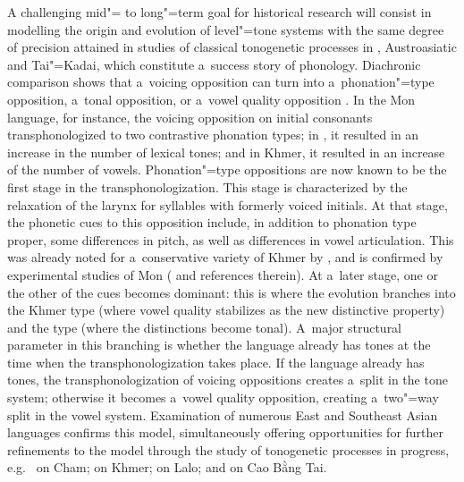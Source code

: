 A challenging mid"= to long"=term goal for historical research will consist in modelling the origin and evolution of level"=tone systems with the same degree of precision attained in studies of classical tonogenetic processes in , Austroasiatic and Tai"=Kadai, which constitute a~success story of  phonology. Diachronic comparison shows that a~voicing opposition can turn into a~phonation"=type opposition, a~tonal opposition, or a~vowel quality opposition \citep{haudricourt1965a,ferlus1979}. In the Mon language, for instance, the voicing opposition on initial consonants transphonologized to two contrastive phonation types; 
in , it resulted in an increase in the number of lexical tones; and in Khmer, it resulted in an increase of the number of vowels. Phonation"=type oppositions are now known to be the first stage in the transphonologization. This stage is characterized by the relaxation of the larynx for syllables with formerly voiced initials. At that stage, the phonetic cues to this opposition include, in addition to phonation type proper, some differences in pitch, as well as differences in vowel articulation. This was already noted for a~{conservative} variety of Khmer by \citet{henderson1952}, and is confirmed by experimental studies of Mon (\citealt{abramsonetal2015} and references therein). At a~later stage, one or the other of the cues becomes dominant: this is where the evolution branches into the Khmer type (where vowel quality stabilizes as the new distinctive property) and the  type (where the distinctions become tonal). A~major structural parameter in this branching is whether the language already has tones at the time when the transphonologization takes place. If the language already has tones, the transphonologization of voicing
oppositions creates a~split in the tone system; otherwise it becomes a~vowel quality opposition, creating a~two"=way split in the vowel system. Examination of numerous East and Southeast Asian languages confirms this model, simultaneously offering opportunities for further refinements to the model through the study of tonogenetic processes in progress, e.g.~\citet{brunelle2012} on Cham; \citet{kirby2014} on Khmer; \citet{yangetal2015} on Lalo; and \citet{pittayaporn.kirby.laryngeal2017} on Cao Bằng Tai. 

